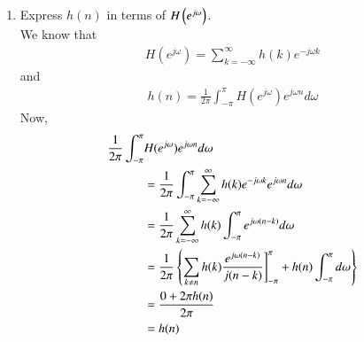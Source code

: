 \documentclass[journal,12pt,twocolumn]{IEEEtran}
\renewcommand\thesection{\arabic{section}}
\begin{document}
\begin{enumerate}[label=\thesection.\arabic*]
     \item Express $h(n)$ in terms of $H\left(e^{j \omega}\right)$.\\
           \solution We know that
           \begin{align}
                H(e^{j\omega})=\sum_{k=-\infty}^\infty h(k)e^{-j\omega k}
           \end{align}
           and
           \begin{align}
                h(n)=\frac{1}{2\pi}\int_{-\pi}^\pi H(e^{j\omega})e^{j\omega n}d\omega
           \end{align}
           Now,
           \begin{align}
                \frac{1}{2\pi}\int_{-\pi}^\pi & H(e^{j\omega})e^{j\omega n}d\omega                                                                                           \\
                                              & =\frac{1}{2\pi}\int_{-\pi}^\pi \sum_{k=-\infty}^\infty h(k)e^{-j\omega k}e^{j\omega n}d\omega                                \\
                                              & =\frac{1}{2\pi} \sum_{k=-\infty}^\infty h(k)\int_{-\pi}^\pi e^{j\omega (n-k)}d\omega                                         \\
                                              & =\frac{1}{2\pi}\left\{ \sum_{k\neq n} h(k)\frac{e^{j\omega (n-k)}}{j(n-k)}\Biggr] _{-\pi}^\pi 	+h(n)\int_{-\pi}^\pi d\omega \right\} \\
                                              & =\frac{0+2\pi h(n)}{2\pi}                                                                                                    \\
                                              & =h(n)
           \end{align}

\end{enumerate}
\end{document}
